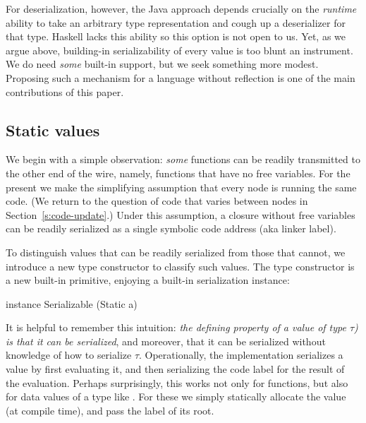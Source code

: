 \documentclass[preprint]{sigplanconf}
\begin{document}
For deserialization, however, the Java approach depends crucially on the \emph{runtime} ability
to take an arbitrary type representation and cough up a deserializer for that type.
Haskell lacks this ability so this option is not open to us.
Yet, as we argue above, building-in serializability of every value is
too blunt an instrument.  We do need \emph{some} built-in support, but
we seek something more modest.  Proposing such a mechanism for a language without reflection is one of 
the main contributions of this paper.

\subsection{Static values}

We begin with a simple observation: \emph{some} functions can be readily
transmitted to the other end of the wire, namely, functions that have no
free variables.  For the present we make the simplifying assumption that every node is running the same code.  (We return to the question
of code that varies between nodes in Section~\ref{s:code-update}.)
Under this assumption, a closure without free variables can be
readily serialized as a single symbolic code address (aka linker label).

\lstset{mathescape=true}

To distinguish values that can be readily serialized from those that cannot, we introduce a new type constructor
 to classify such values.  The type 
constructor  is a new built-in primitive, 
enjoying a built-in serialization instance:
\begin{code}
  instance Serializable (Static a)
\end{code}
It is helpful to remember this intuition: \emph{the defining property of
a value of type \emph{ $\tau$)} is that it can be serialized},
and moreover, that it can be serialized without knowledge of how to serialize $\tau$.
Operationally, the implementation serializes a  value by first evaluating it,
and then serializing the code label for the result of the evaluation.
Perhaps surprisingly, this works not only for functions, but also for data values of a type like .
For these we simply statically allocate the  value (at compile time), and pass the label of its root.
\end{document}

